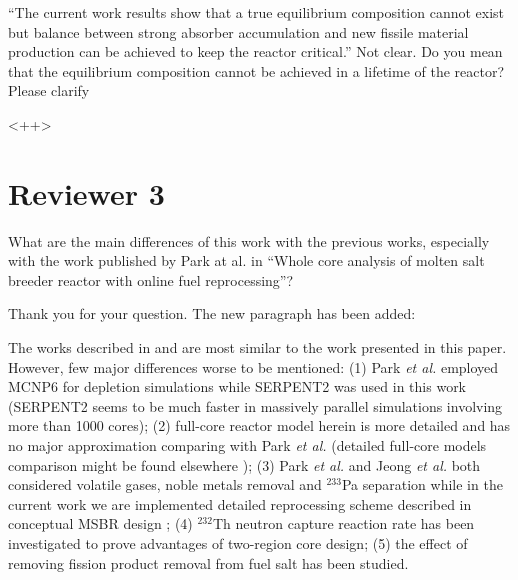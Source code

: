 \documentclass[answers,11pt]{exam}
\begin{document}
\begin{questions}



        \question ``The current work results show that a true equilibrium 
        composition cannot exist but balance between strong absorber 
        accumulation and new fissile material production can be achieved to 
        keep the reactor critical.'' Not clear. Do you mean that the equilibrium 
        composition cannot be achieved in a lifetime of the reactor? Please 
        clarify
        \begin{solution}
                <++>
        \end{solution}







        \section*{Reviewer 3}


        \question  What are the main differences of this work with the previous 
        works, especially with the work published by Park at al. in ``Whole core 
        analysis of molten salt breeder reactor with online fuel reprocessing''?
        \begin{solution}
                Thank you for your question. The new paragraph has been added:
                
                The works described in \cite{park_whole_2015} and 
                \cite{jeong_equilibrium_2016} are most similar to the work 
                presented in this paper. However, few major differences worse to 
                be mentioned: (1) Park \emph{et al.} employed MCNP6 for depletion 
				simulations while SERPENT2 was used in this work (SERPENT2 seems 
				to be much faster in massively parallel simulations involving more 
				than 1000 cores); (2) full-core reactor model herein is more 
				detailed and has no major approximation comparing with Park \emph{et al.}
				(detailed full-core models comparison might be found elsewhere
				\cite{rykhlevskii_full-core_2017}); (3) Park \emph{et al.} and 
				Jeong \emph{et al.} both considered volatile gases, noble metals 
				removal and $^{233}$Pa separation while in the current work we are 
				implemented detailed reprocessing scheme described in conceptual 
				MSBR design \cite{robertson_conceptual_1971}; (4) $^{232}$Th 
				neutron capture reaction rate has been investigated to prove 
				advantages of two-region core design; (5) the effect of removing 
				fission product removal from fuel salt has been studied. 
        \end{solution}


\end{questions}
\end{document}
